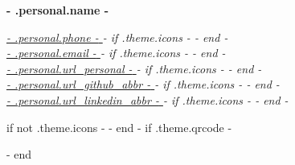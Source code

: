 \begin{minipage}{0.5\textwidth}
	\begin{flushleft}
		\textbf{\Huge{ {{- .personal.name -}} }} \\ \hfill \vfill
	\end{flushleft}
\end{minipage}
\begin{minipage}{
	{{- if .theme.qrcode -}}
	0.3
	{{- else -}}
	0.45
	{{- end -}}
\textwidth}
	\begin{flushright}
		\textit{
			\href{tel: {{- .personal.phone -}} }{ {{- .personal.phone -}} } \hspace{1mm}
			{{- if .theme.icons -}} \color{accentlight}\color{black} {{- end -}}  \\
			\href{mailto: {{- .personal.email -}} }{ {{- .personal.email -}} } \hspace{1mm}
			{{- if .theme.icons -}} \color{accentlight}\color{black} {{- end -}}  \\
			\href{ {{- .personal.url_personal -}} }{ {{- .personal.url_personal -}} } \hspace{1mm}
			{{- if .theme.icons -}} \color{accentlight}\color{black} {{- end -}}  \\
			\href{ {{- .personal.url_github -}} }{ {{- .personal.url_github_abbr -}} } \hspace{1mm}
			{{- if .theme.icons -}} \color{accentlight}\color{black} {{- end -}}  \\
			\href{ {{- .personal.url_linkedin -}} }{ {{- .personal.url_linkedin_abbr -}} } \hspace{1mm}
			{{- if .theme.icons -}} \color{accentlight}\color{black} {{- end -}}  \\
		}
	\end{flushright}
\end{minipage}
{{ if not .theme.icons -}}
	\color{accentlight}\vline\color{black}
{{- end -}}
{{ if .theme.qrcode -}} 
	\begin{minipage}{0.15\textwidth}
	\vfill
	\hfill
	\hfill
	\vfill
	\end{minipage}
{{- end }}

